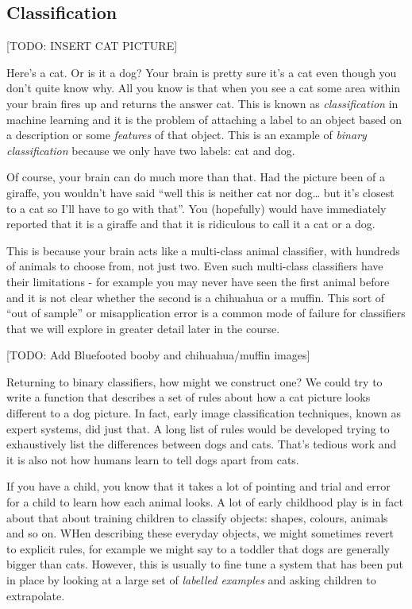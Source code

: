\documentclass[
]{book}
\theoremstyle{definition}
\theoremstyle{definition}
\theoremstyle{definition}
\theoremstyle{definition}
\theoremstyle{remark}
\begin{document}
\hypertarget{classification}{%
\subsection{Classification}\label{classification}}

{[}TODO: INSERT CAT PICTURE{]}

Here's a cat. Or is it a dog? Your brain is pretty sure it's a cat even though you don't quite know why. All you know is that when you see a cat some area within your brain fires up and returns the answer cat. This is known as \emph{classification} in machine learning and it is the problem of attaching a label to an object based on a description or some \emph{features} of that object. This is an example of \emph{binary classification} because we only have two labels: cat and dog.

Of course, your brain can do much more than that. Had the picture been of a giraffe, you wouldn't have said ``well this is neither cat nor dog\ldots{} but it's closest to a cat so I'll have to go with that''. You (hopefully) would have immediately reported that it is a giraffe and that it is ridiculous to call it a cat or a dog.

This is because your brain acts like a multi-class animal classifier, with hundreds of animals to choose from, not just two. Even such multi-class classifiers have their limitations - for example you may never have seen the first animal before and it is not clear whether the second is a chihuahua or a muffin. This sort of ``out of sample'' or misapplication error is a common mode of failure for classifiers that we will explore in greater detail later in the course.

{[}TODO: Add Bluefooted booby and chihuahua/muffin images{]}

Returning to binary classifiers, how might we construct one? We could try to write a function that describes a set of rules about how a cat picture looks different to a dog picture. In fact, early image classification techniques, known as expert systems, did just that. A long list of rules would be developed trying to exhaustively list the differences between dogs and cats. That's tedious work and it is also not how humans learn to tell dogs apart from cats.

If you have a child, you know that it takes a lot of pointing and trial and error for a child to learn how each animal looks. A lot of early childhood play is in fact about that about training children to classify objects: shapes, colours, animals and so on. WHen describing these everyday objects, we might sometimes revert to explicit rules, for example we might say to a toddler that dogs are generally bigger than cats. However, this is usually to fine tune a system that has been put in place by looking at a large set of \emph{labelled examples} and asking children to extrapolate.
\end{document}
